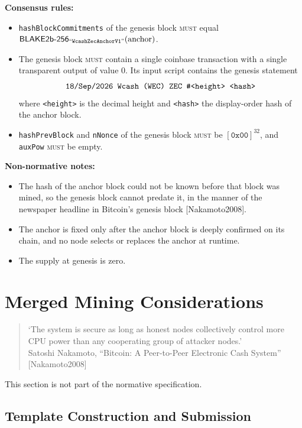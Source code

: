 \documentclass[10pt,letterpaper]{article}
\newcommand\MUST{\textsc{must}}
\newcommand\fn[1]{\mathsf{#1}}
\newcommand\ascii[1]{\text{\textquotedblleft\texttt{#1}\textquotedblright}}
\newcommand\rules[1]{\par\textbf{#1}}
\theoremstyle{plain}
\begin{document}
\rules{Consensus rules:}
\begin{itemize}
\item \texttt{hashBlockCommitments} of the genesis block \MUST{} equal $\fn{BLAKE2b\text{-}256}_{\ascii{WcashZecAnchorV1}}(\mathrm{anchor})$.
\item The genesis block \MUST{} contain a single coinbase transaction with a single transparent output of value 0. Its input script contains the genesis statement
\[ \text{\texttt{18/Sep/2026 Wcash (WEC) ZEC \#<height> <hash>}} \]
where \texttt{<height>} is the decimal height and \texttt{<hash>} the display-order hash of the anchor block.
\item \texttt{hashPrevBlock} and \texttt{nNonce} of the genesis block \MUST{} be $[\mathtt{0x00}]^{32}$, and \texttt{auxPow} \MUST{} be empty.
\end{itemize}

\rules{Non-normative notes:}
\begin{itemize}
\item The hash of the anchor block could not be known before that block was mined, so the genesis block cannot predate it, in the manner of the newspaper headline in Bitcoin's genesis block [Nakamoto2008].
\item The anchor is fixed only after the anchor block is deeply confirmed on its chain, and no node selects or replaces the anchor at runtime.
\item The supply at genesis is zero.
\end{itemize}

\section{Merged Mining Considerations}\label{sec:mining}

\begin{quote}\small
`The system is secure as long as honest nodes collectively control more CPU power than any cooperating group of attacker nodes.'\\
\hspace*{\fill}Satoshi Nakamoto, ``Bitcoin: A Peer-to-Peer Electronic Cash System'' [Nakamoto2008]
\end{quote}

This section is not part of the normative specification.

\subsection{Template Construction and Submission}\label{sec:pools}
\end{document}

